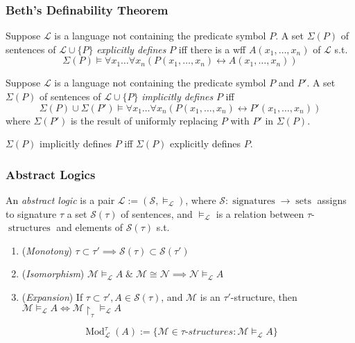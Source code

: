 \documentclass[UTF8,aspectratio=43,11pt,colorlinks,compress,openany]{beamer}%
\begin{document}
\begin{frame}\frametitle{Beth's Definability Theorem}
\setlength\abovedisplayskip{0pt}
\setlength\belowdisplayskip{0pt}
	\begin{definition}
		Suppose $\mathscr{L}$ is a language not containing the predicate symbol $P$. A set $\Sigma(P)$ of sentences of $\mathscr{L}\cup\{P\}$ \emph{explicitly defines} $P$ iff there is a wff $A(x_1,\dots,x_n)$ of $\mathscr{L}$ s.t.
		\[\Sigma(P)\vDash\forall x_1\dots\forall x_n(P(x_1,\dots,x_n)\leftrightarrow A(x_1,\dots,x_n))\]
	\end{definition}
	\begin{definition}
		Suppose $\mathscr{L}$ is a language not containing the predicate symbol $P$ and $P'$. A set $\Sigma(P)$ of sentences of $\mathscr{L}\cup\{P\}$ \emph{implicitly defines} $P$ iff
		\[\Sigma(P)\cup\Sigma(P')\vDash\forall x_1\dots\forall x_n(P(x_1,\dots,x_n)\leftrightarrow P'(x_1,\dots,x_n))\]
		where $\Sigma(P')$ is the result of uniformly replacing $P$ with $P'$ in $\Sigma(P)$.
	\end{definition}
	\begin{theorem}
		$\Sigma(P)$ implicitly defines $P$ iff $\Sigma(P)$ explicitly defines $P$.
	\end{theorem}
	\centerline{}
\end{frame}

\begin{frame}\frametitle{Abstract Logics}
	\begin{definition}
		An \emph{abstract logic} is a pair $\mathcal{L}:=(\mathcal{S},\vDash_{\mathcal{L}})$, where $\mathcal{S}:\operatorname{signatures}\to\operatorname{sets}$ assigns to signature $\tau$ a set $\mathcal{S}(\tau)$ of sentences, and $\vDash_{\mathcal{L}}$ is a relation between $\tau$-$\operatorname{structures}$ and elements of
		$\mathcal{S}(\tau)$ s.t.
		\begin{enumerate}
			\item (\emph{Monotony}) $\tau\subset\tau'\implies \mathcal{S}(\tau) \subset \mathcal{S}(\tau')$
			\item (\emph{Isomorphism}) $\mathcal{M}\vDash_{\mathcal{L}} A\;\&\;\mathcal{M} \cong \mathcal{N}\implies\mathcal{N}\vDash_{\mathcal{L}}	 A$
			\item (\emph{Expansion}) If $\tau\subset\tau', A\in \mathcal{S}(\tau)$, and $\mathcal{M}$ is an $\tau'$-structure, then $\mathcal{M}\vDash_{\mathcal{L}} A\iff\mathcal{M}{\restriction_\tau}\vDash_{\mathcal{L}} A$
		\end{enumerate}
	\end{definition}
	\[\operatorname{Mod}_{\mathcal{L}}^\tau(A):=\big\{\mathcal{M}\in\tau\text{-}structures:\mathcal{M}\vDash_{\mathcal{L}} A\big\}\]
\end{frame}
\end{document}
